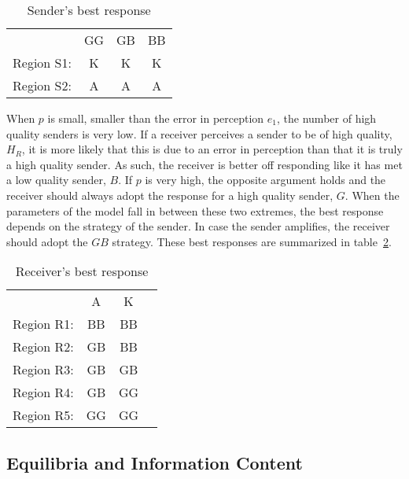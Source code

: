 \documentclass[a4paper,12pt]{article}
\numberwithin{equation}{section}
\begin{document}
\begin{table}[h]
\begin{center}
\begin{tabular}{lccc}
 & GG & GB & BB\\
Region S1: & K & K & K\\
Region S2: & A & A & A
\end{tabular}
\end{center}
\caption{Sender's best response}
\label{tab:CueGamewithUnconditionalAmplification/BestResponseS}
\end{table}

When $p$ is small, smaller than the error in perception $e_{1}$, the number of high quality senders is very low. If a receiver perceives a sender to be of high quality, $H_{R}$, it is more likely that this is due to an error in perception than that it is truly a high quality sender. As such, the receiver is better off responding like it has met a low quality sender, $B$. If $p$ is very high, the opposite argument holds and the receiver should always adopt the response for a high quality sender, $G$. When the parameters of the model fall in between these two extremes, the best response depends on the strategy of the sender. In case the sender amplifies, the receiver should adopt the $GB$ strategy. These best responses are summarized in table~\ref{tab:CueGamewithUnconditionalAmplification/BestResponseR}.

\begin{table}[h]
\begin{center}
\begin{tabular}{lccc}
 & A & K\\
Region R1: & BB & BB\\
Region R2: & GB & BB\\
Region R3: & GB & GB\\
Region R4: & GB & GG\\
Region R5: & GG & GG
\end{tabular}
\end{center}
\caption{Receiver's best response}
\label{tab:CueGamewithUnconditionalAmplification/BestResponseR}
\end{table}


\subsection{Equilibria and Information Content}
\label{sec:Cue Game with Unconditional Amplification/Equilibria}
\end{document}
